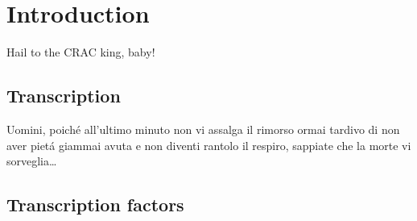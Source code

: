 \documentclass{Thesis}
\begin{document}
\frontmatter

\part{Introduction}

\begin{savequote}[70mm]
Hail to the CRAC king, baby!
\end{savequote}

\chapter{Transcription}


	
	
	
	

\begin{savequote}[70mm]
Uomini, poich\'{e} all'ultimo minuto non vi assalga il rimorso ormai tardivo di non aver piet\'{a} giammai avuta e non diventi rantolo il respiro, sappiate che la morte vi sorveglia\ldots
{} 
\end{savequote}

\chapter{Transcription factors}


	
	
	


%
%
%



\singlespacing


\end{document}
